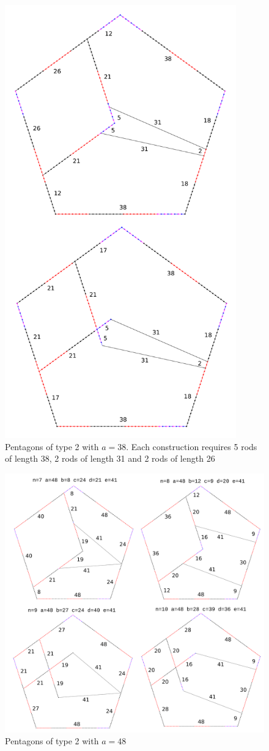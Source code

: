 \documentclass[11pt]{article}
\begin{document}
\begin{figure}
\centering
\includegraphics[width=10cm]{figs/pentagons-2-38}
\caption{Pentagons of type 2 with $a=38$. Each construction requires 5 rods
of length 38, 2 rods of length 31 and 2 rods of length 26}
\label{pentagons-2-38}
\end{figure}

\begin{figure}
\centering
\includegraphics[width=15cm]{figs/pentagons-2-48}
\caption{Pentagons of type 2 with $a=48$}
\label{pentagons-2-48}
\end{figure}
\end{document}
